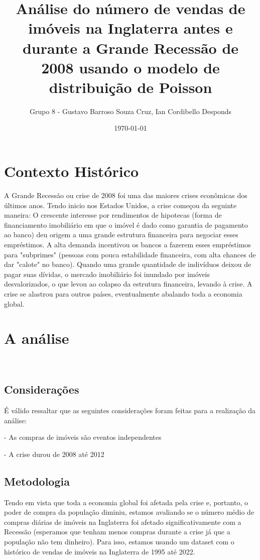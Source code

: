 \documentclass{article}
\title{\textbf{
    Análise do número de vendas de imóveis na Inglaterra antes e durante a Grande Recessão
    de 2008 usando o modelo de distribuição de Poisson}}
\author{Grupo 8 - Gustavo Barroso Souza Cruz, Ian Cordibello Desponds}
\date{\today}
\begin{document}
    \maketitle
    \section*{Contexto Histórico}
    
      A Grande Recessão ou crise de 2008 foi uma das maiores crises econômicas dos últimos anos. Tendo inicio nos Estados Unidos,
    a crise começou da seguinte maneira: O crescente interesse por rendimentos de hipotecas (forma de financiamento imobiliário
    em que o imóvel é dado como garantia de pagamento ao banco) deu origem a uma grande estrutura financeira para negociar esses
    empréstimos. A alta demanda incentivou os bancos a fazerem esses empréstimos para "subprimes" (pessoas com pouca estabilidade
    financeira, com alta chances de dar "calote" no banco). Quando uma grande quantidade de indivíduos deixou de pagar suas dívidas,
    o mercado imobiliário foi inundado por imóveis desvalorizados, o que levou ao colapso da estrutura financeira, levando à crise.
    A crise se alastrou para outros países, eventualmente abalando toda a economia global.\\
    

    \section*{A análise}\
    
    \subsection*{Considerações}

    É válido ressaltar que as seguintes considerações foram feitas para a realização da análise:

    - As compras de imóveis são eventos independentes

    - A crise durou de 2008 até 2012\\


    \subsection*{Metodologia}

    Tendo em vista que toda a economia global foi afetada pela crise e, portanto, o poder de compra da população diminiu,
    estamos avaliando se o número médio de compras diárias de imóveis na Inglaterra foi afetado significativamente com a 
    Recessão (esperamos que tenham menos compras durante a crise já que a população não tem dinheiro). Para isso, estamos 
    usando um dataset com o histórico de vendas de imóveis na Inglaterra de 1995 até 2022.
    
\end{document}
